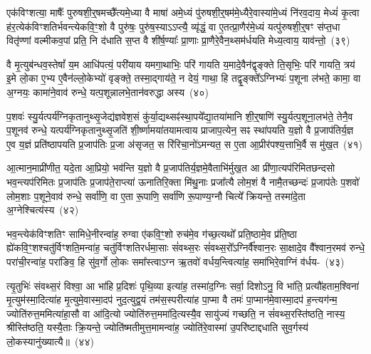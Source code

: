 {\anuvakamend[{आ॒ह॒ दे॒वानां॒ वै पत्नीः᳚ पृणै॒षा षट्च॑}]}

एक॑विꣳशत्या॒ माषैः᳚ पुरुषशी॒र्॒\mbox{}षमच्छै᳚त्यमे॒ध्या वै माषा॑ अमे॒ध्यं पु॑रुषशी॒र्॒\mbox{}षम॑\-मे॒ध्यै\-रे॒वास्या॑मे॒ध्यं नि॑रव॒दाय॒ मेध्यं॑ कृ॒त्वा ह॑र॒त्येक॑विꣳशतिर्भवन्त्येकवि॒ꣳ॒शो वै पुरु॑षः॒ पुरु॑ष॒स्या\-ऽऽप्त्यै॒ व्यृ॑द्धं॒ वा ए॒तत्प्रा॒णैर॑मे॒ध्यं यत्पु॑रुषशी॒र्॒\mbox{}षꣳ स॑प्त॒धा वितृ॑ण्णां वल्मीकव॒पां प्रति॒ नि द॑धाति स॒प्त वै शी॑र्\mbox{}ष॒ण्याः᳚ प्रा॒णाः प्रा॒णैरे॒वैन॒थ्सम॑र्धयति मेध्य॒त्वाय॒ याव॑न्तो॒~(३९)\ip

वै मृ॒त्युब॑न्धव॒स्तेषां᳚ य॒म आधि॑पत्यं॒ परी॑याय यमगा॒थाभिः॒ परि॑ गायति य॒मादे॒वैन॑द्वृङ्क्ते ति॒सृभिः॒ परि॑ गायति॒ त्रय॑ इ॒मे लो॒का ए॒भ्य ए॒वैन॑ल्लो॒केभ्यो॑ वृङ्क्ते॒ तस्मा॒द्गाय॑ते॒ न देयं॒ गाथा॒ हि तद्वृ॒ङ्क्ते᳚\-ऽग्निभ्यः॑ प॒शूना ल॑भते॒ कामा॒ वा अ॒ग्नयः॒ कामा॑ने॒वाव॑ रुन्धे॒ यत्प॒शून्नालभे॒तान॑वरुद्धा अस्य~(४०)\ip

प॒शवः॑ स्यु॒र्यत्पर्य॑ग्निकृतानुथ्सृ॒जेद्य॑ज्ञवेश॒सं कु॑र्या॒द्यथ्सꣴ॑स्था॒पये᳚द्या॒तया॑मानि शी॒र्॒\mbox{}षाणि॑ स्यु॒र्यत्प॒शूना॒लभ॑ते॒ तेनै॒व प॒शूनव॑ रुन्धे॒ यत्पर्य॑ग्निकृतानुथ्सृ॒जति॑ शी॒र्ष्णामया॑तयामत्वाय प्राजाप॒त्येन॒ सꣴ स्था॑पयति य॒ज्ञो वै प्र॒जा\-प॑तिर्य॒ज्ञ ए॒व य॒ज्ञं प्रति॑\-ष्ठापयति प्र॒जा\-प॑तिः प्र॒जा अ॑सृजत॒ स रि॑रिचा॒नो॑\-ऽमन्यत॒ स ए॒ता आ॒प्रीर॑पश्य॒त्ताभि॒र्वै स मु॑ख॒त~(४१)\ip

आ॒त्मान॒माप्री॑णीत॒ यदे॒ता आ॒प्रियो॒ भव॑न्ति य॒ज्ञो वै प्र॒जा\-प॑तिर्य॒ज्ञमे॒वैताभि॑र्मुख॒त आ प्री॑णा॒त्यप॑रिमितछन्दसो भव॒न्त्यप॑रिमितः प्र॒जा\-प॑तिः प्र॒जा\-प॑ते॒राप्त्या॑ ऊनातिरि॒क्ता मि॑थु॒नाः प्रजा᳚त्यै लोम॒शं वै नामै॒तच्छन्दः॑ प्र॒जा\-प॑तेः प॒शवो॑ लोम॒शाः प॒शूने॒वाव॑ रुन्धे॒ सर्वा॑णि॒ वा ए॒ता रू॒पाणि॒ सर्वा॑णि रू॒पाण्य॒ग्नौ चित्ये᳚ क्रियन्ते॒ तस्मा॑दे॒ता अ॒ग्नेश्चित्य॑स्य~(४२)\ip

भव॒न्त्येक॑विꣳशतिꣳ सामिधे॒नीरन्वा॑ह॒ रुग्वा ए॑कवि॒ꣳ॒शो रुच॑मे॒व ग॑च्छ॒त्यथो᳚ प्रति॒ष्ठामे॒व प्र॑ति॒ष्ठा ह्ये॑कवि॒ꣳ॒शश्चतु॑र्विꣳशति॒मन्वा॑ह॒ चतु॑र्विꣳशतिरर्धमा॒साः सं॑वथ्स॒रः सं॑वथ्स॒रो᳚\-ऽग्निर्वै᳚श्वान॒रः सा॒क्षादे॒व वै᳚श्वान॒रमव॑ रुन्धे॒ परा॑ची॒रन्वा॑ह॒ परा॑ङिव॒ हि सु॑व॒र्गो लो॒कः समा᳚स्त्वा\-ऽग्न ऋ॒तवो॑ वर्धय॒न्त्वित्या॑ह॒ समा॑भिरे॒वाग्निं व॑र्धय-~(४३)\ip

त्यृ॒तुभिः॑ संवथ्स॒रं विश्वा॒ आ भा॑हि प्र॒दिशः॑ पृथि॒व्या इत्या॑ह॒ तस्मा॑द॒ग्निः सर्वा॒ दिशो\-ऽनु॒ वि भा॑ति॒ प्रत्यौ॑हताम॒श्विना॑ मृ॒त्युम॑स्मा॒दित्या॑ह मृ॒त्युमे॒वास्मा॒दप॑ नुद॒त्युद्व॒यं तम॑स॒स्परीत्या॑ह पा॒प्मा वै तमः॑ पा॒प्मान॑मे॒वास्मा॒दप॑ ह॒न्त्यग॑न्म॒ ज्योति॑रुत्त॒ममित्या॑हा॒सौ वा आ॑दि॒त्यो ज्योति॑रुत्त॒ममा॑दि॒त्यस्यै॒व सायु॑ज्यं गच्छति॒ न सं॑वथ्स॒रस्ति॑ष्ठति॒ नास्य॒ श्रीस्ति॑ष्ठति॒ यस्यै॒ताः क्रि॒यन्ते॒ ज्योति॑ष्मतीमुत्त॒मामन्वा॑ह॒ ज्योति॑रे॒वास्मा॑ उ॒परि॑ष्टाद्दधाति सुव॒र्गस्य॑ लो॒कस्यानु॑ख्यात्यै॥~(४४)\ip

